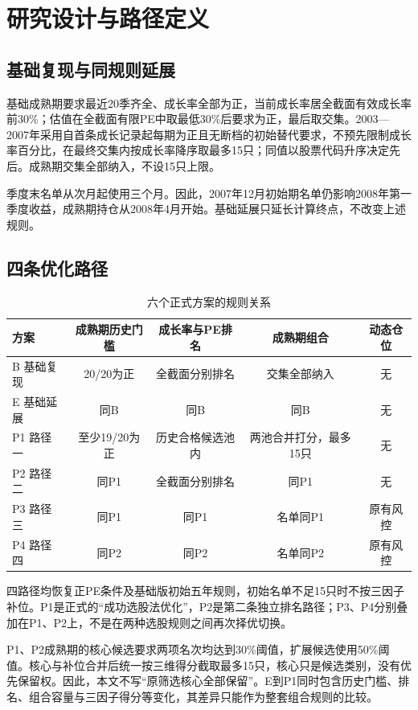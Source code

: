 
\chapter{研究设计与路径定义}
\section{基础复现与同规则延展}
基础成熟期要求最近20季齐全、成长率全部为正，当前成长率居全截面有效成长率前30\%；估值在全截面有限PE中取最低30\%后要求为正，最后取交集。2003—2007年采用自首条成长记录起每期为正且无断档的初始替代要求，不预先限制成长率百分比，在最终交集内按成长率降序取最多15只；同值以股票代码升序决定先后。成熟期交集全部纳入，不设15只上限。

季度末名单从次月起使用三个月。因此，2007年12月初始期名单仍影响2008年第一季度收益，成熟期持仓从2008年4月开始。基础延展只延长计算终点，不改变上述规则。

\section{四条优化路径}
\begin{table}[htbp]
\centering
\caption{六个正式方案的规则关系}
\renewcommand{\arraystretch}{1.18}
\small
\setlength{\tabcolsep}{4.5pt}
\begin{tabularx}{\textwidth}{@{}p{2.5cm}*{4}{C}@{}}
\toprule
方案 & 成熟期历史门槛 & 成长率与PE排名 & 成熟期组合 & 动态仓位 \\
\midrule
B 基础复现 & 20/20为正 & 全截面分别排名 & 交集全部纳入 & 无 \\
E 基础延展 & 同B & 同B & 同B & 无 \\
P1 路径一 & 至少19/20为正 & 历史合格候选池内 & 两池合并打分，最多15只 & 无 \\
P2 路径二 & 同P1 & 全截面分别排名 & 同P1 & 无 \\
P3 路径三 & 同P1 & 同P1 & 名单同P1 & 原有风控 \\
P4 路径四 & 同P2 & 同P2 & 名单同P2 & 原有风控 \\
\bottomrule
\end{tabularx}
\end{table}

四路径均恢复正PE条件及基础版初始五年规则，初始名单不足15只时不按三因子补位。P1是正式的“成功选股法优化”，P2是第二条独立排名路径；P3、P4分别叠加在P1、P2上，不是在两种选股规则之间再次择优切换。

P1、P2成熟期的核心候选要求两项名次均达到30\%阈值，扩展候选使用50\%阈值。核心与补位合并后统一按三维得分截取最多15只，核心只是候选类别，没有优先保留权。因此，本文不写“原筛选核心全部保留”。E到P1同时包含历史门槛、排名、组合容量与三因子得分等变化，其差异只能作为整套组合规则的比较。

